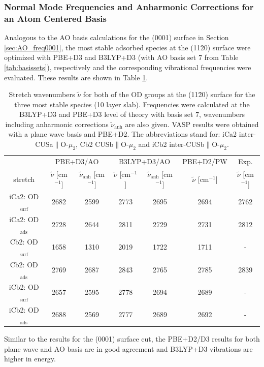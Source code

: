 \documentclass[11pt,DIV=13,BCOR=5mm,a4paper,headinclude]{scrbook}
\renewcommand{\vec}[1]{\underline{#1}}
\begin{document}
\subsubsection{Normal Mode Frequencies and Anharmonic Corrections for an Atom Centered Basis}
Analogous to the AO basis calculations for the (0001) surface in Section \ref{sec:AO_freq0001}, the most stable adsorbed species at the (11\=20) surface were optimized with PBE+D3 and B3LYP+D3 (with AO basis set 7 from Table \ref{tab:basissets}), respectively and the corresponding vibrational frequencies were evaluated.
These results are shown in Table \ref{tab:freqs_11-20_crystal}.
\begin{table}[!h]
  \centering
  \caption{Stretch wavenumbers $\tilde{\nu}$ for both of the OD groups at the (11\=20) surface for the three most stable species (10 layer slab).
Frequencies were calculated at the B3LYP+D3 and PBE+D3 level of theory with basis set 7, wavenumbers including anharmonic corrections $\tilde{\nu}_\textrm{anh}$ are also given.
VASP results were obtained with a plane wave basis and PBE+D2.
The abbreviations stand for: iCa2 inter-CUSa$\parallel$O-$\mu_2$, Cb2 CUSb$\parallel$O-$\mu_2$ and iCb2 inter-CUSb$\parallel$O-$\mu_2$.}
  \begin{tabular}{ccc|cc|c|c}
  \toprule
   & \multicolumn{2}{c}{PBE+D3/AO} & \multicolumn{2}{c}{B3LYP+D3/AO} &PBE+D2/PW&Exp.\cite{Heiden11-20_2018}\\
  stretch & $\tilde{\nu}$ [cm$^{-1}$] &$\tilde{\nu}_\textrm{anh}$ [cm$^{-1}$] &$\tilde{\nu}$ [cm$^{-1}$] & $\tilde{\nu}_\textrm{anh}$ [cm$^{-1}$]&$\tilde{\nu}$ [cm$^{-1}$]&$\tilde{\nu}$ [cm$^{-1}$]\\\midrule
  iCa2: OD$_{\textrm{surf}}$ &2682 &2599 &2773 &2695 & 2694&2762\\
  iCa2: OD$_{\textrm{ads}}$  &2728 &2644 &2811 &2729 & 2731&2812\\
  Cb2: OD$_{\textrm{surf}}$  &1658 &1310 &2019 &1722 & 1711&-\\
  Cb2: OD$_{\textrm{ads}}$   &2769 &2687 &2843 &2765 & 2785&2839\\
  iCb2: OD$_{\textrm{surf}}$ &2657 &2595 &2778 &2694 & 2689&-\\
  iCb2: OD$_{\textrm{ads}}$  &2688 &2569 &2777 &2689 & 2692&-\\\bottomrule
  \end{tabular}
  \label{tab:freqs_11-20_crystal}
\end{table}
Similar to the results for the (0001) surface cut, the PBE+D2/D3 results for both plane wave and AO basis are in good agreement and B3LYP+D3 vibrations are higher in energy.
\end{document}
